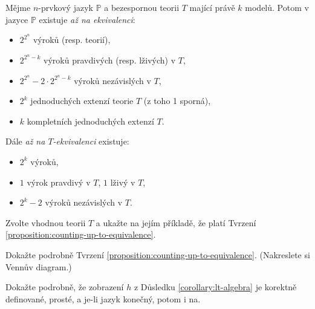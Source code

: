 \begin{proposition}\label{proposition:counting-up-to-equivalence}
Mějme $n$-prvkový jazyk $\mathbb P$ a bezespornou teorii $T$ mající právě $k$ modelů. Potom v jazyce $\mathbb P$ existuje \emph{až na ekvivalenci}:
\begin{itemize}
    \item $2^{2^n}$ výroků (resp. teorií),
    \item $2^{2^n-k}$ výroků pravdivých (resp. lživých) v $T$,
    \item $2^{2^n}-2\cdot 2^{2^n-k}$ výroků nezávislých v $T$,
    \item $2^k$ jednoduchých extenzí teorie $T$ (z toho 1 sporná),
    \item $k$ kompletních jednoduchých extenzí $T$.
\end{itemize}
Dále \emph{až na $T$-ekvivalenci} existuje:
\begin{itemize}
    \item $2^k$ výroků,
    \item $1$ výrok pravdivý v $T$, $1$ lživý v $T$,
    \item $2^k-2$ výroků nezávislých v $T$.
\end{itemize}
\end{proposition}

\begin{exercise}
    Zvolte vhodnou teorii $T$ a ukažte na jejím příkladě, že platí Tvrzení \ref{proposition:counting-up-to-equivalence}.
\end{exercise}

\begin{exercise}
    Dokažte podrobně Tvrzení \ref{proposition:counting-up-to-equivalence}. (Nakreslete si Vennův diagram.)
\end{exercise}

\begin{exercise}
    Dokažte podrobně, že zobrazení $h$ z Důsledku \ref{corollary:lt-algebra} je korektně definované, prosté, a je-li jazyk konečný, potom i na.
\end{exercise}



